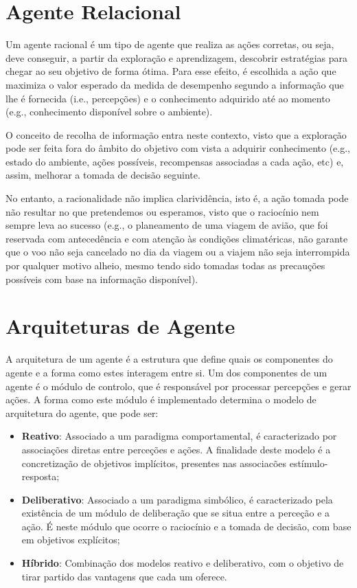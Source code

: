 \section{Agente Relacional}\label{sec:agente-relacional}

Um agente racional é um tipo de agente que realiza as ações corretas, ou seja, deve conseguir, a partir da exploração e aprendizagem, descobrir estratégias para chegar ao seu objetivo de forma ótima.
Para esse efeito, é escolhida a ação que maximiza o valor esperado da medida de desempenho segundo a informação que lhe é fornecida (i.e., percepções) e o conhecimento adquirido até ao momento (e.g., conhecimento disponível sobre o ambiente).

O conceito de recolha de informação entra neste contexto, visto que a exploração pode ser feita fora do âmbito do objetivo com vista a adquirir conhecimento (e.g., estado do ambiente, ações possíveis, recompensas associadas a cada ação, etc) e, assim, melhorar a tomada de decisão seguinte.

No entanto, a racionalidade não implica clarividência, isto é, a ação tomada pode não resultar no que pretendemos ou esperamos, visto que o raciocínio nem sempre leva ao sucesso (e.g., o planeamento de uma viagem de avião, que foi reservada com antecedência e com atenção às condições climatéricas, não garante que o voo não seja cancelado no dia da viagem ou a viajem não seja interrompida por qualquer motivo alheio, mesmo tendo sido tomadas todas as precauções possíveis com base na informação disponível).


\section{Arquiteturas de Agente}\label{sec:arquiteturas-agente}

A arquitetura de um agente é a estrutura que define quais os componentes do agente e a forma como estes interagem entre si.
Um dos componentes de um agente é o módulo de controlo, que é responsável por processar percepções e gerar ações.
A forma como este módulo é implementado determina o modelo de arquitetura do agente, que pode ser:

\begin{itemize}
    \item \textbf{Reativo}: Associado a um paradigma comportamental, é caracterizado por associações diretas entre perceções e ações.
    A finalidade deste modelo é a concretização de objetivos implícitos, presentes nas associacões estímulo-resposta;
    \item \textbf{Deliberativo}: Associado a um paradigma simbólico, é caracterizado pela existência de um módulo de deliberação que se situa entre a perceção e a ação.
    É neste módulo que ocorre o raciocínio e a tomada de decisão, com base em objetivos explícitos;
    \item \textbf{Híbrido}: Combinação dos modelos reativo e deliberativo, com o objetivo de tirar partido das vantagens que cada um oferece.
\end{itemize}
